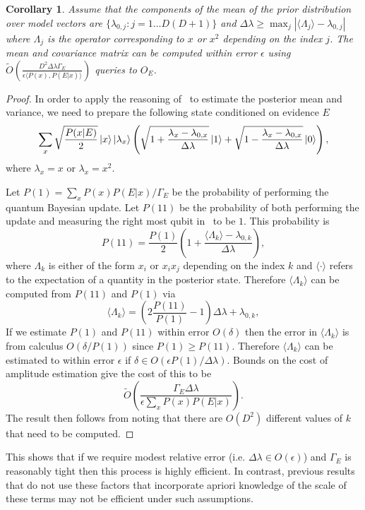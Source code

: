 \documentclass[aps,amsmath,onecolumn,amssymb,notitlepage]{revtex4-1}
\newtheorem{corollary}{Corollary}
\begin{document}
\begin{corollary}
Assume that the components of the mean of the prior distribution over model vectors are $\{\lambda_{0,j}:j=1\ldots D(D+1)\}$ and $\Delta \lambda \ge \max_j |\langle \Lambda_j \rangle-\lambda_{0,j}|$ where $\Lambda_j$ is the operator corresponding to $x$ or $x^2$  depending on the index $j$.  The mean and covariance matrix can be computed within error $\epsilon$ using $\tilde{O}\left(\frac{D^2\Delta \lambda \Gamma_E}{\epsilon \langle P(x), P(E|x)\rangle}\right)$ queries to $O_E$.\label{cor:method}
\end{corollary}
\begin{proof}
In order to apply the reasoning of~ to estimate the posterior mean and variance, we need to prepare the following state conditioned on evidence $E$
\begin{equation}
\sum_{x} \sqrt{\frac{P(x|E)}{2}} \left|x\right\rangle\left|\lambda_x\right\rangle\left(\sqrt{1+\frac{\lambda_x-\lambda_{0,x} }{\Delta \lambda}}\left|1\right\rangle + \sqrt{1-\frac{\lambda_x-\lambda_{0,x} }{\Delta \lambda}}\left|0\right\rangle \right),\label{eq:hadtest2}
\end{equation}
where $\lambda_x =x$ or $\lambda_x =x^2$.

Let $P(1)= \sum_x P(x) P(E|x)/\Gamma_E$ be the probability of performing the quantum Bayesian update.  Let $P(11)$ be the probability of both performing the update and measuring the right most qubit in~ to be $1$.  This probability is
\begin{equation}
P(11) = \frac{P(1)}{2}\left(1+\frac{\langle \Lambda_k \rangle -\lambda_{0,k}}{\Delta \lambda} \right),
\end{equation}
where $\Lambda_k$ is either of the form $x_i$ or $x_ix_j$ depending on the index $k$ and $\langle \cdot \rangle$ refers to the expectation of a quantity in the posterior state.
Therefore $\langle \Lambda_k \rangle$ can be computed from $P(11)$ and $P(1)$ via
\begin{equation}
\langle \Lambda_k \rangle = \left(2\frac{P(11)}{P(1)}-1 \right)\Delta \lambda + \lambda_{0,k},
\end{equation}
If we estimate $P(1)$ and $P(11)$ within error $O(\delta)$ then the error in $\langle \Lambda_k \rangle$ is from calculus $O(\delta/P(1))$ since $P(1)\ge P(11)$.  Therefore $\langle \Lambda_k \rangle$ can be estimated to within error $\epsilon$ if $\delta \in O(\epsilon P(1) /\Delta \lambda)$.  Bounds on the cost of amplitude estimation give the cost of this to be~\cite{BHM+02}
\begin{equation}
\tilde{O} \left(\frac{\Gamma_E \Delta \lambda}{\epsilon \sum_x P(x) P(E|x)} \right).
\end{equation}
The result then follows from noting that there are $O(D^2)$ different values of $k$ that need to be computed.
\end{proof}
This shows that if we require modest relative error (i.e. $\Delta \lambda \in O(\epsilon)$) and $\Gamma_E$ is reasonably tight then this process is highly efficient.  In contrast, previous results that do not use these factors that incorporate apriori knowledge of the scale of these terms may not be efficient under such assumptions.
\end{document}
